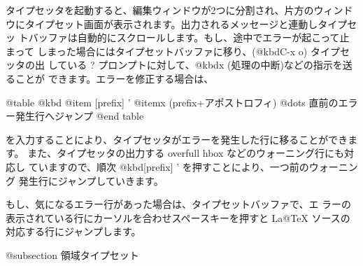   タイプセッタを起動すると、編集ウィンドウが2つに分割され、片方のウィンド
ウにタイプセット画面が表示されます。出力されるメッセージと連動しタイプセッ
トバッファは自動的にスクロールします。もし、途中でエラーが起こって止まって
しまった場合にはタイプセットバッファに移り、(@kbd{C-x o}) タイプセッタの出
している ? プロンプトに対して、@kbd{x} (処理の中断)などの指示を送ることが
できます。エラーを修正する場合は、

@table @kbd
@item [prefix] '
@itemx (prefix+アポストロフィ)
        @dots{} 直前のエラー発生行へジャンプ
@end table

を入力することにより、タイプセッタがエラーを発生した行に移ることができます。
また、タイプセッタの出力する overfull hbox などのウォーニング行にも対応し
ていますので、順次 @kbd{[prefix] '} を押すことにより、一つ前のウォーニング
発生行にジャンプしていきます。

  もし、気になるエラー行があった場合は、タイプセットバッファで、エ
ラーの表示されている行にカーソルを合わせスペースキーを押すと La@TeX{} 
ソースの対応する行にジャンプします。

@subsection 領域タイプセット


